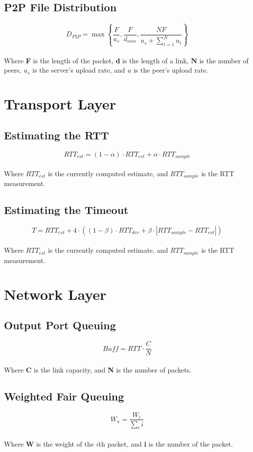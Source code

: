 \documentclass{article}
\begin{document}
\subsection{P2P File Distribution}
\vspace{.3cm}
\[ D_{P2P} = \max \left\{ \frac{F}{u_s}, \frac{F}{d_{min}}, \frac{NF}{u_s + \sum^N_{i=1}u_i} \right\} \] \\
Where \textbf{F} is the length of the packet, \textbf{d} is the length of a link, \textbf{N} is the number of peers, $u_s$ is the server's upload rate, and $u$ is the peer's upload rate.

\section{Transport Layer}
\subsection{Estimating the RTT}
\vspace{.3cm}
\[ RTT_{est} = (1 - \alpha) \cdot RTT_{est} + \alpha \cdot RTT_{sample} \] \\
Where $RTT_{est}$ is the currently computed estimate, and $RTT_{sample}$ is the RTT measurement.

\subsection{Estimating the Timeout}
\vspace{.3cm}
\[ T = RTT_{est} + 4 \cdot ((1-\beta) \cdot RTT_{dev} + \beta \cdot | RTT_{sample} - RTT_{est} |) \] \\
Where $RTT_{est}$ is the currently computed estimate, and $RTT_{sample}$ is the RTT measurement.

\section{Network Layer}
\subsection{Output Port Queuing}
\vspace{.3cm}
\[ Buff = RTT \cdot \frac{C}{N} \] \\
Where \textbf{C} is the link capacity, and \textbf{N} is the number of packets.

\subsection{Weighted Fair Queuing}
\vspace{.3cm}
\[ W_a = \frac{W_i}{\sum_i i} \] \\
Where \textbf{W} is the weight of the $i$th packet, and \textbf{i} is the number of the packet.
\end{document}
